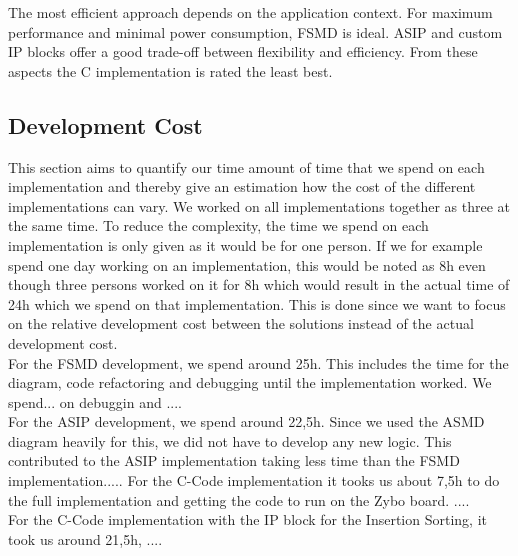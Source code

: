 \documentclass[conference]{IEEEtran}
\begin{document}
The most efficient approach depends on the application context. For maximum performance and minimal power consumption, FSMD is ideal. ASIP and custom IP blocks offer a good trade-off between flexibility and efficiency. From these aspects the C implementation is rated the least best.
\subsection{Development Cost}
This section aims to quantify our time amount of time that we spend on each implementation and thereby give an estimation how the cost of the different implementations can vary. We worked on all implementations together as three at the same time. To reduce the complexity, the time we spend on each implementation is only given as it would be for one person. If we for example spend one day working on an implementation, this would be noted as 8h even though three persons worked on it for 8h which would result in the actual time of 24h which we spend on that implementation. This is done since we want to focus on the relative development cost between the solutions instead of the actual development cost.\\
For the FSMD development, we spend around 25h. This includes the time for the diagram, code refactoring and debugging until the implementation worked. We spend... on debuggin and .... \\
For the ASIP development, we spend around 22,5h. Since we used the ASMD diagram heavily for this, we did not have to develop any new logic. This contributed to the ASIP implementation taking less time than the FSMD implementation.....
For the C-Code implementation it tooks us about 7,5h to do the full implementation and getting the code to run on the Zybo board. ....\\
For the C-Code implementation with the IP block for the Insertion Sorting, it took us around 21,5h, .... \\
\end{document}
